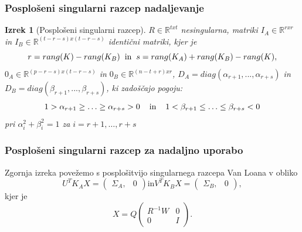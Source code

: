 \documentclass{beamer}
\newtheorem{izrek}{Izrek}
\begin{document}
\begin{frame}
\frametitle{Posplošeni singularni razcep nadaljevanje}
\begin{izrek}[Posplošeni singularni razcep]
\label{izrek:GSVD1} $R \in \mathbb{R}^{txt}$ nesingularna, matriki $I_A \in \mathbb{R}^{rxr}$ in $I_B \in \mathbb{R}^{(t-r-s)x(t-r-s)}$ identični matriki, kjer je 
$$r = rang(K) - rang(K_B)\hspace{2mm} \text{in}\hspace{2mm} s = rang(K_A) + rang(K_B) - rang(K),$$
$0_A \in \mathbb{R}^{(p-r-s)x(t-r-s)}$ in $0_B \in \mathbb{R}^{(n-t+r)xr}$,
$D_A = diag(\alpha_{r+1},..., \alpha_{r+s})$ in $D_B = diag(\beta_{r+1},..., \beta_{r+s})$, ki zadoščajo pogoju:
$$1 > \alpha_{r+1} \geq \ldots \geq \alpha_{r+s} > 0  \hspace{4mm} \text{in} \hspace{4mm} 1 < \beta_{r+1} \leq \ldots \leq \beta_{r+s} < 0$$
pri $\alpha_i^2 + \beta_i^2 = 1$ za $ i = r+1,\ldots, r+s$
\vspace{-2mm} 
\end{izrek}
\end{frame}

\begin{frame}
\frametitle{Posplošeni singularni razcep za nadaljno uporabo}
Zgornja izreka povežemo s posplošitvijo singularnega razcepa Van Loana v obliko $$U^T K_A X = \left(\begin{array}{cc} \Sigma_A, & 0 \end{array}\right) \text{in} V^T K_B X = \left(\begin{array}{cc} \Sigma_B, & 0 \end{array}\right), $$ kjer je $$X = Q  \left(\begin{array}{cc} R^{-1}W & 0\\ 0 & I \end{array}\right) .$$
\end{frame}
\end{document}
